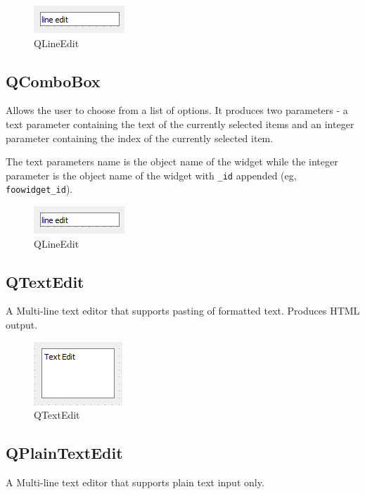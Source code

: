 \documentclass[a4paper,10pt]{book}
\begin{document}
\begin {figure}[!ht]
 \centering
 \includegraphics[scale=1.0]{images/widget/qlineedit}
 \caption{QLineEdit}
\end {figure}

\subsection{QComboBox}
Allows the user to choose from a list of options. It produces two parameters - a text parameter containing the text of the currently selected items and an integer parameter containing the index of the currently selected item.

The text parameters name is the object name of the widget while the integer parameter is the object name of the widget with \verb|_id| appended (eg, \verb|foowidget_id|).

\begin {figure}[!ht]
 \centering
 \includegraphics[scale=1.0]{images/widget/qlineedit}
 \caption{QLineEdit}
\end {figure}

\subsection{QTextEdit}
A Multi-line text editor that supports pasting of formatted text. Produces HTML output.

\begin {figure}[!ht]
 \centering
 \includegraphics[scale=1.0]{images/widget/qtextedit}
 \caption{QTextEdit}
\end {figure}

\subsection{QPlainTextEdit}

A Multi-line text editor that supports plain text input only.
\end{document}
